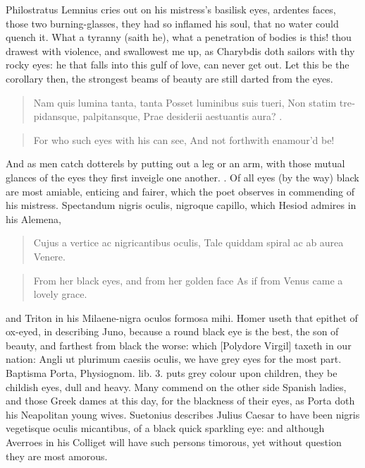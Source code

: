 Philostratus Lemnius cries out on his mistress's basilisk eyes,
ardentes faces, those two burning-glasses, they had so inflamed his
soul, that no water could quench it. What a tyranny (saith he), what a
penetration of bodies is this! thou drawest with violence, and
swallowest me up, as Charybdis doth sailors with thy rocky eyes: he
that falls into this gulf of love, can never get out. Let this be the
corollary then, the strongest beams of beauty are still darted from the
eyes.

\begin{latin}
\begin{verse}%
Nam quis lumina tanta, tanta
Posset luminibus suis tueri,
Non statim trepidansque, palpitansque,
Prae desiderii aestuantis aura? \etc{}.
\end{verse}%
\end{latin}
\translationrule%
\begin{verse}%
For who such eyes with his can see,
And not forthwith enamour'd be!
\end{verse}%

And as men catch dotterels by putting out a leg or an arm, with those
mutual glances of the eyes they first inveigle one another.
. Of all eyes (by the
way) black are most amiable, enticing and fairer, which the poet
observes in commending of his mistress. Spectandum nigris oculis,
nigroque capillo, which Hesiod admires in his Alemena,

\begin{latin}
\begin{verse}%
Cujus a vertice ac nigricantibus oculis,
Tale quiddam spiral ac ab aurea Venere.
\end{verse}%
\end{latin}
\translationrule%
\begin{verse}%
From her black eyes, and from her golden face
As if from Venus came a lovely grace.
\end{verse}%

and Triton in his Milaene-nigra oculos formosa mihi. Homer
useth that epithet of ox-eyed, in describing Juno, because a round
black eye is the best, the son of beauty, and farthest from black the
worse: which [Polydore Virgil] taxeth in our nation: Angli ut
plurimum caesiis oculis, we have grey eyes for the most part. Baptisma
Porta, Physiognom. lib. 3. puts grey colour upon children, they be
childish eyes, dull and heavy. Many commend on the other side Spanish
ladies, and those Greek dames at this day, for the blackness of
their eyes, as Porta doth his Neapolitan young wives. Suetonius
describes Julius Caesar to have been nigris vegetisque oculis
micantibus, of a black quick sparkling eye: and although Averroes in
his Colliget will have such persons timorous, yet without question they
are most amorous.

